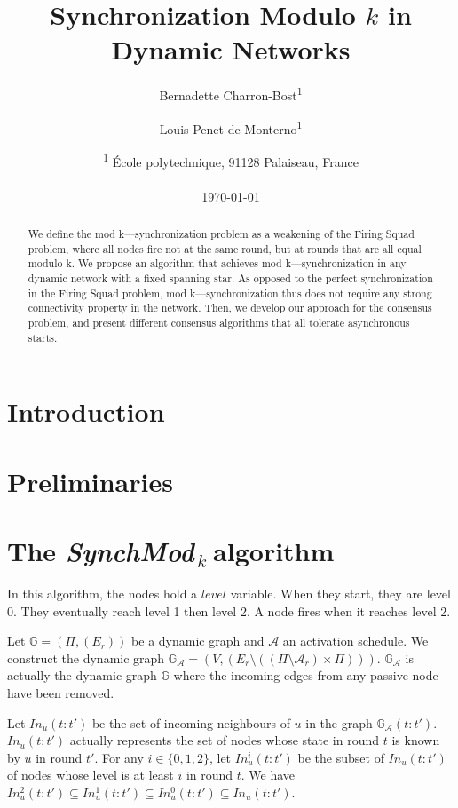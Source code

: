 \documentclass[11pt,letterpaper]{article}
\title{Synchronization Modulo $k$ in Dynamic Networks}
\author{Bernadette Charron-Bost\textsuperscript{1} \and Louis Penet de Monterno\textsuperscript{1}}
\date{\textsuperscript{1} \'Ecole polytechnique, 91128 Palaiseau, France\\~\\ \today}
\newcommand{\SM}{{\em SynchMod}$_{\,k}\ $}
\begin{document}
\maketitle
\tableofcontents

\begin{abstract}
	We define the mod k—synchronization problem as a weakening of the Firing Squad problem,
	where all nodes fire not at the same round, but at rounds that are all equal modulo k.
	We propose an algorithm that achieves mod k—synchronization  in any dynamic network
	with a fixed spanning star. As opposed to the perfect synchronization in
	the Firing Squad problem, mod k—synchronization thus does not require
	any strong connectivity property in the network. 
	Then, we develop our approach for the consensus problem,
	and present different consensus algorithms that all tolerate asynchronous starts.
\end{abstract}

\section{Introduction}

\section{Preliminaries}\label{sec:model}

\section{The \SM algorithm}

In this algorithm, the nodes hold a $level$ variable. When they start, they are level 0. They eventually reach level 1 then level 2.
A node fires when it reaches level 2.

Let $\mathds{G} = (\Pi, (E_r))$ be a dynamic graph and $\mathcal{A}$ an activation schedule.
We construct the dynamic graph $\mathds{G}_\mathcal{A} = (V, (E_r \setminus ((\Pi \setminus \mathcal{A}_r) \times \Pi)))$.
$\mathds{G}_\mathcal{A}$ is actually the dynamic graph $\mathds{G}$ where the incoming edges from any passive node have been removed.

Let $In_u(t:t')$ be the set of incoming neighbours of $u$ in the graph $\mathds{G}_\mathcal{A}(t:t')$.
$In_u(t:t')$ actually represents the set of nodes whose state in round $t$ is known by $u$ in round $t'$.
For any $i \in \{0, 1, 2\}$, let $In_u^i(t:t')$ be the subset of $In_u(t:t')$ of nodes whose level is at least $i$ in round $t$.
We have $In_u^2(t:t') \subseteq In_u^1(t:t') \subseteq In_u^0(t:t') \subseteq In_u(t:t')$.
\end{document}
